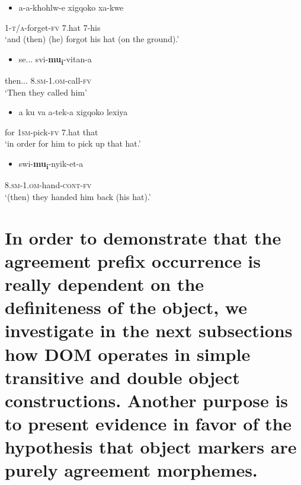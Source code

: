 \documentclass[output=paper]{langsci/langscibook}
\begin{document}
\chapter[]{\rmfamily }
\begin{itemize}
\item \gll a-a-khohlw-e               xigqoko          xa-kwe\\
\end{itemize}
     1-\textsc{t/a}{}-forget-\textsc{fv}           7.hat                7-his\\
\glt ‘and (then) (he) forgot his hat (on the ground).’
\z

\begin{itemize}
\item \gll se...         svi-\textbf{mu}\textbf{\textup{\textsubscript{i}}}{}-vitan-a\\
\end{itemize}
     then...     8.\textsc{sm-1.om}{}-call-\textsc{fv}\\
\glt ‘Then they called him’
\z

\begin{itemize}
\item \gll a ku va       a-tek-a              xigqoko       lexiya\\
\end{itemize}
     for             1\textsc{sm}{}-pick-\textsc{fv}      7.hat             that\\
\glt ‘in order for him to pick up that hat.’
\z

\begin{itemize}
\item \gll swi-\textbf{mu}\textbf{\textup{\textsubscript{i}}}{}-nyik-et-a\\
\end{itemize}
     8.\textsc{sm}{}-1.\textsc{om}{}-hand-\textsc{cont}{}-\textsc{fv}\\
\glt ‘(then) they handed him back (his hat).’
\z

\chapter[In order to demonstrate that the agreement prefix occurrence is really dependent on the definiteness of the object, we investigate in the next subsections how DOM operates in simple transitive and double object constructions. Another purpose is to present evidence in favor of the hypothesis that object markers are purely agreement morphemes.]{In order to demonstrate that the agreement prefix occurrence is really dependent on the definiteness of the object, we investigate in the next subsections how DOM operates in simple transitive and double object constructions. Another purpose is to present evidence in favor of the hypothesis that object markers are purely agreement morphemes.}
\end{document}
